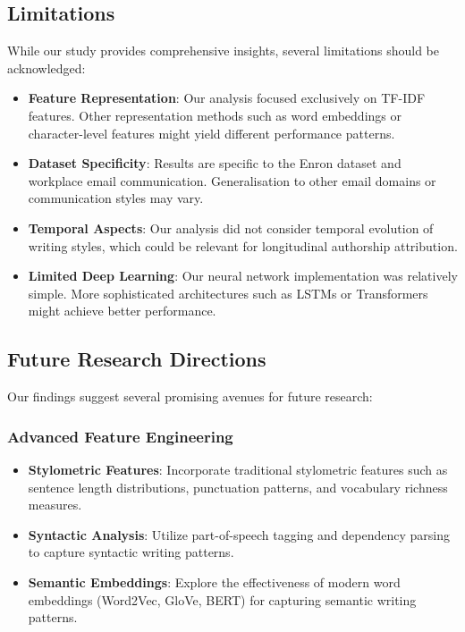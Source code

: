 \documentclass[11pt,a4paper]{article}
\begin{document}
\subsection{Limitations}

While our study provides comprehensive insights, several limitations should be acknowledged:

\begin{itemize}
    \item \textbf{Feature Representation}: Our analysis focused exclusively on TF-IDF features. Other representation methods such as word embeddings or character-level features might yield different performance patterns.
    
    \item \textbf{Dataset Specificity}: Results are specific to the Enron dataset and workplace email communication. Generalisation to other email domains or communication styles may vary.
    
    \item \textbf{Temporal Aspects}: Our analysis did not consider temporal evolution of writing styles, which could be relevant for longitudinal authorship attribution.
    
    \item \textbf{Limited Deep Learning}: Our neural network implementation was relatively simple. More sophisticated architectures such as LSTMs or Transformers might achieve better performance.
\end{itemize}

\subsection{Future Research Directions}

Our findings suggest several promising avenues for future research:

\subsubsection{Advanced Feature Engineering}

\begin{itemize}
    \item \textbf{Stylometric Features}: Incorporate traditional stylometric features such as sentence length distributions, punctuation patterns, and vocabulary richness measures.
    
    \item \textbf{Syntactic Analysis}: Utilize part-of-speech tagging and dependency parsing to capture syntactic writing patterns.
    
    \item \textbf{Semantic Embeddings}: Explore the effectiveness of modern word embeddings (Word2Vec, GloVe, BERT) for capturing semantic writing patterns.
\end{itemize}
\end{document}
